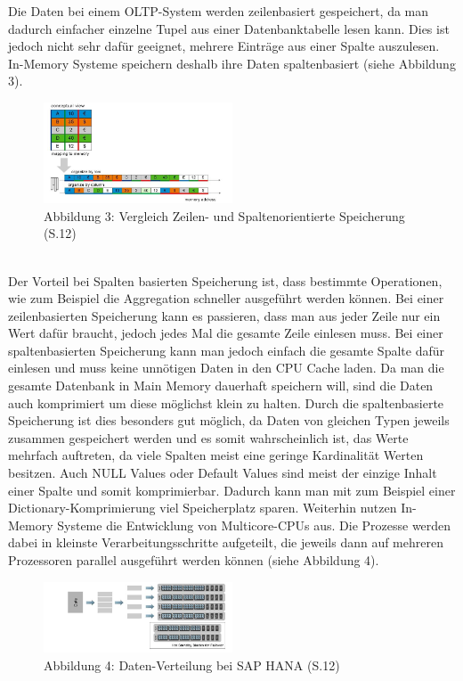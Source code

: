 Die Daten bei einem OLTP-System werden zeilenbasiert gespeichert, da man dadurch einfacher einzelne Tupel aus einer Datenbanktabelle lesen kann. Dies ist jedoch nicht sehr dafür geeignet, mehrere Einträge aus einer Spalte auszulesen.
In-Memory Systeme speichern deshalb ihre Daten spaltenbasiert (siehe Abbildung 3).
\begin{figure}[ht]
  \begin{center}
  \includegraphics[width=0.5\textwidth]{images/mappingtomemory.png}
  \end{center}
  \caption{Abbildung 3: Vergleich Zeilen- und Spaltenorientierte Speicherung (\cite{sap}S.12)}
  \label{fig_3}
\end{figure} 
\\
Der Vorteil bei Spalten basierten Speicherung ist, dass bestimmte Operationen, wie zum Beispiel die Aggregation schneller ausgeführt werden können. Bei einer zeilenbasierten Speicherung kann es passieren, dass man aus jeder Zeile nur ein Wert dafür braucht, jedoch jedes Mal die gesamte Zeile einlesen muss. Bei einer spaltenbasierten Speicherung kann man jedoch einfach die gesamte Spalte dafür einlesen und muss keine unnötigen Daten in den CPU Cache laden.
Da man die gesamte Datenbank in Main Memory dauerhaft speichern will, sind die Daten auch komprimiert um diese möglichst klein zu halten.
Durch die spaltenbasierte Speicherung ist dies besonders gut möglich, da Daten von gleichen Typen jeweils zusammen gespeichert werden und es somit wahrscheinlich ist, das Werte mehrfach auftreten, da viele Spalten meist eine geringe Kardinalität Werten besitzen. Auch NULL Values oder Default Values sind meist der einzige Inhalt einer Spalte und somit komprimierbar. Dadurch kann man mit zum Beispiel einer Dictionary-Komprimierung viel Speicherplatz sparen.
Weiterhin nutzen In-Memory Systeme die Entwicklung von Multicore-CPUs aus. Die Prozesse werden dabei in kleinste Verarbeitungsschritte aufgeteilt, die jeweils dann auf mehreren Prozessoren parallel ausgeführt werden können (siehe Abbildung 4).\\
\begin{figure}[ht]
  \begin{center}
  \includegraphics[width=0.5\textwidth]{images/data.png}
  \end{center}
  \caption{Abbildung 4: Daten-Verteilung bei SAP HANA (\cite{sap}S.12)}
  \label{fig_4}
\end{figure} 
